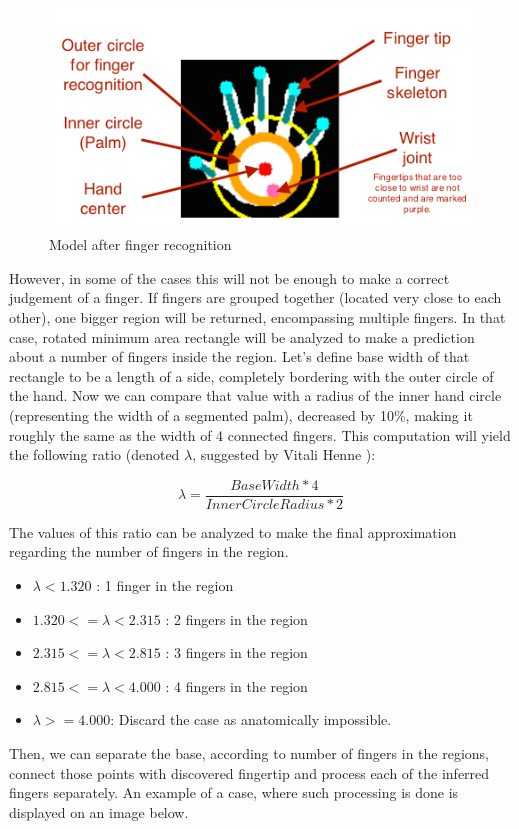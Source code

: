 \documentclass[a4paper,11pt,oneside]{article}
\begin{document}
\begin{figure}[H]
\centering
\includegraphics[scale=1.4]{hand-recognized.png}
\caption{Model after finger recognition}
\end{figure}

However, in some of the cases this will not be enough to make a correct judgement of a finger. If fingers are grouped together (located very close to each other), one bigger region will be returned, encompassing multiple fingers. In that case, rotated minimum area rectangle will be analyzed to make a prediction about a number of fingers inside the region. Let's define base width of that rectangle to be a length of a side, completely bordering with the outer circle of the hand. Now we can compare that value with a radius of the inner hand circle (representing the width of a segmented palm), decreased by 10\%, making it roughly the same as the width of 4 connected fingers. This computation will yield the following ratio (denoted $\lambda$, suggested by Vitali Henne \cite{VH01}):

\[\lambda = \frac{BaseWidth * 4}{InnerCircleRadius * 2} \]

The values of this ratio can be analyzed to make the final approximation regarding the number of fingers in the region.
\begin{itemize}
\item $\lambda < 1.320$ : 1 finger in the region
\item $1.320 <= \lambda < 2.315$ : 2 fingers in the region
\item $2.315 <= \lambda < 2.815$ : 3 fingers in the region
\item $2.815 <= \lambda < 4.000$ : 4 fingers in the region
\item $\lambda >= 4.000$: Discard the case as anatomically impossible.
\end{itemize}

Then, we can separate the base, according to number of fingers in the regions, connect those points with discovered fingertip and process each of the inferred fingers separately. An example of a case, where such processing is done is displayed on an image below.
\end{document}
